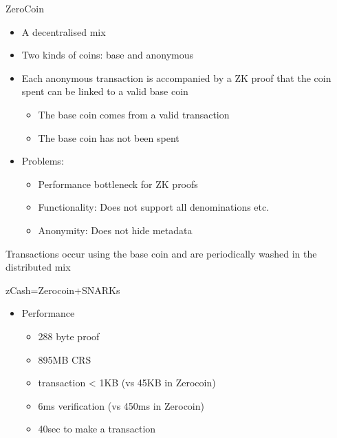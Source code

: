 \documentclass[handout]{beamer}
\begin{document}
\begin{frame}{ZeroCoin}
    \begin{itemize} 
    \item A decentralised mix \pause
    \item Two kinds of coins: base and anonymous \pause
    \item Each anonymous transaction is accompanied by a ZK proof that the coin spent can be linked to a valid base coin \pause
    \begin{itemize} 
        \item The base coin comes from a valid transaction \pause
        \item The base coin has not been spent \pause
    \end{itemize}
    \item Problems:
        \begin{itemize}
            \item Performance bottleneck for ZK proofs \pause
            \item Functionality: Does not support all denominations etc. \pause
            \item Anonymity: Does not hide metadata
        \end{itemize}
    \end{itemize}
    \item Transactions occur using the base coin and are periodically washed in the distributed mix
\end{frame}

\begin{frame}{zCash=Zerocoin+SNARKs}
    \begin{itemize}
        \item Performance
        \begin{itemize}
            \begin{itemize}
                 \item 288 byte proof \pause
                 \item 895MB CRS \pause
                 \item transaction < 1KB (vs 45KB in Zerocoin) \pause
                 \item 6ms verification (vs 450ms in Zerocoin) \pause
                 \item 40sec to make a transaction
            \end{itemize}
        \end{itemize}
    \end{itemize}
\end{frame}
\end{document}
